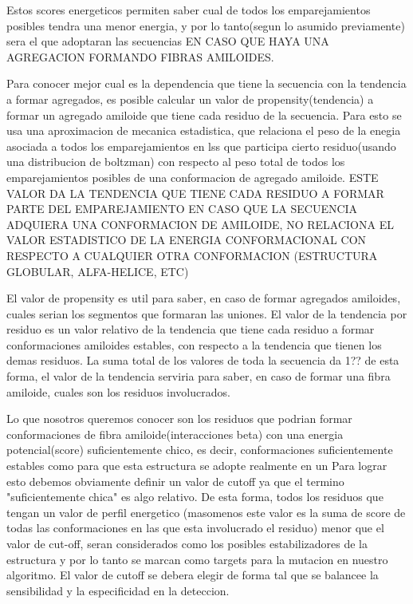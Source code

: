 Estos scores energeticos permiten saber cual de todos los emparejamientos posibles tendra una menor energia, y por lo tanto(segun lo asumido previamente) sera el que adoptaran las secuencias EN CASO QUE HAYA UNA AGREGACION FORMANDO FIBRAS AMILOIDES.



Para conocer mejor cual es la dependencia que tiene la secuencia con la tendencia a formar agregados, es posible calcular un valor de propensity(tendencia) a formar un agregado amiloide que tiene cada residuo de la secuencia. Para esto se usa una aproximacion de mecanica estadistica, que relaciona el peso de la enegia asociada a todos los emparejamientos en lss que participa cierto residuo(usando una distribucion de boltzman) con respecto al peso total de todos los emparejamientos posibles de una conformacion de agregado amiloide. 
ESTE VALOR DA LA TENDENCIA QUE TIENE CADA RESIDUO A FORMAR PARTE DEL EMPAREJAMIENTO EN CASO QUE LA SECUENCIA ADQUIERA UNA CONFORMACION DE AMILOIDE, NO RELACIONA EL VALOR ESTADISTICO DE LA ENERGIA CONFORMACIONAL CON RESPECTO A CUALQUIER OTRA CONFORMACION (ESTRUCTURA GLOBULAR, ALFA-HELICE, ETC)

El valor de propensity es util para saber, en caso de formar agregados amiloides, cuales serian los segmentos que formaran las uniones.
El valor de la tendencia por residuo es un valor relativo de la tendencia que tiene cada residuo a formar conformaciones amiloides estables, con respecto a la tendencia que tienen los demas residuos. La suma total de los valores de toda la secuencia da 1?? de esta forma, el valor de la tendencia serviria para saber, en caso de formar una fibra amiloide, cuales son los residuos involucrados.


Lo que nosotros queremos conocer son los residuos que podrian formar conformaciones de fibra amiloide(interacciones beta) con una energia potencial(score) suficientemente chico, es decir, conformaciones suficientemente estables como para que esta estructura se adopte realmente en un %
Para lograr esto debemos obviamente definir un valor de cutoff ya que el termino "suficientemente chica" es algo relativo. De esta forma, todos los residuos que tengan un valor de perfil energetico (masomenos este valor es la suma de score de todas las conformaciones en las que esta involucrado el residuo) menor que el valor de cut-off, seran considerados como los posibles estabilizadores de la estructura y por lo tanto se marcan como targets para la mutacion en nuestro algoritmo.
El valor de cutoff se debera elegir de forma tal que se balancee la sensibilidad y la especificidad en la deteccion.



